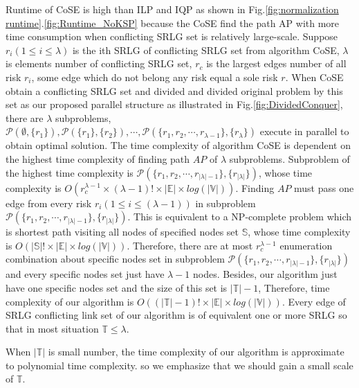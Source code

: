 Runtime of CoSE is high than ILP and IQP as shown in Fig.\ref{fig:normalization runtime}.\ref{fig:Runtime_NoKSP} because the CoSE find the path AP with more time consumption when conflicting SRLG set is relatively large-scale. Suppose $r_i(1\leq i\leq \lambda)$ is the ith SRLG of conflicting SRLG set from algorithm CoSE, $\lambda$ is elements number of  conflicting SRLG set, $r_c$ is the largest edges number of all risk $r_i$, some edge which do not belong any risk equal a sole risk $r$. When CoSE obtain a conflicting SRLG set and divided and divided original problem by this set as our proposed parallel structure as illustrated in Fig.\ref{fig:DividedConquer}, there are $\lambda$ subproblems, $\mathcal{P}(\emptyset,\{r_1\}),\mathcal{P}(\{r_1\},\{r_2\}),\cdots ,\mathcal{P}(\{r_1,r_2,\cdots ,{r_{ \mathbb{\lambda} -1}}\},\{r_{ \mathbb{\lambda} }\})$ execute in parallel to obtain optimal solution. The time complexity of algorithm CoSE is dependent on the highest time complexity of finding path $AP$ of $\lambda$ subproblems. Subproblem of the highest time complexity is $\mathcal{P}(\{r_1,r_2,\cdots ,{r_{| \mathbb{\lambda} |-1}}\},\{r_{| \mathbb{\lambda} |}\})$, whose time complexity is $O(r_c^{\lambda-1}\times (\lambda-1) !\times|\mathbb{E}|\times log(|\mathbb{V}|))$. Finding $AP$ must pass one edge from every risk $r_i(1\leq i\leq (\lambda-1))$ in subproblem $\mathcal{P}(\{r_1,r_2,\cdots ,{r_{| \mathbb{\lambda} |-1}}\},\{r_{| \mathbb{\lambda} |}\})$. This is equivalent to a NP-complete problem which is shortest path visiting all nodes of specified nodes set $\mathbb{S}$, whose time complexity is $O(|\mathbb{S}| !\times|\mathbb{E}|\times log(|\mathbb{V}|))$. Therefore, there are at most $r_c^{\lambda-1}$ enumeration combination about specific nodes set in subproblem $\mathcal{P}(\{r_1,r_2,\cdots ,{r_{| \mathbb{\lambda} |-1}}\},\{r_{| \mathbb{\lambda} |}\})$ and every specific nodes set just have $\lambda-1$ nodes. Besides, our algorithm just have one specific nodes set and the size of this set is $|\mathbb{T}|-1$, Therefore, time complexity of our algorithm is $O({(|\mathbb{T}|-1)}!\times |\mathbb{E}|\times log(|\mathbb{V}|))$. Every edge of SRLG conflicting link set of our algorithm is of equivalent one or more SRLG so that in most situation $\mathbb{T}\leq \lambda$.

When $|\mathbb{T}|$ is small number, the time complexity of our algorithm is approximate to polynomial time complexity. so we emphasize that we should gain a small scale of $\mathbb{T}$.

